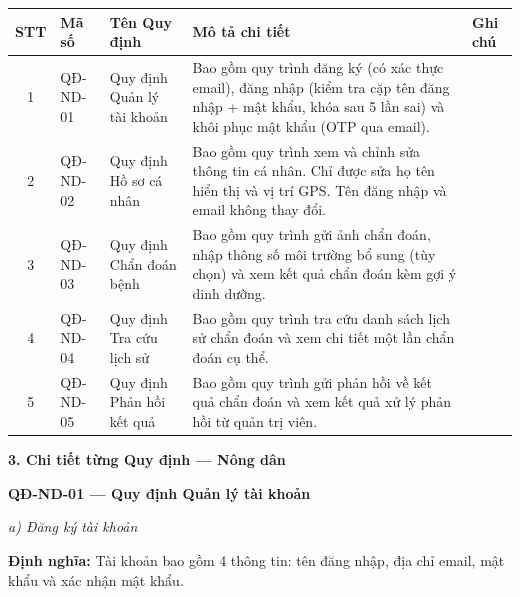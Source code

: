 \documentclass[12pt,a4paper]{article}
\begin{document}
\begin{longtable}{|c|l|l|p{7cm}|l|}
    \hline
    \rowcolor{headerblue}
    \textbf{STT} & \textbf{Mã số} & \textbf{Tên Quy định}      & \textbf{Mô tả chi tiết}                                                                                                                                     & \textbf{Ghi chú} \\
    \hline
    \endhead
    1            & QĐ-ND-01       & Quy định Quản lý tài khoản & Bao gồm quy trình đăng ký (có xác thực email), đăng nhập (kiểm tra cặp tên đăng nhập + mật khẩu, khóa sau 5 lần sai) và khôi phục mật khẩu (OTP qua email). &                  \\
    \hline
    2            & QĐ-ND-02       & Quy định Hồ sơ cá nhân     & Bao gồm quy trình xem và chỉnh sửa thông tin cá nhân. Chỉ được sửa họ tên hiển thị và vị trí GPS. Tên đăng nhập và email không thay đổi.                    &                  \\
    \hline
    3            & QĐ-ND-03       & Quy định Chẩn đoán bệnh    & Bao gồm quy trình gửi ảnh chẩn đoán, nhập thông số môi trường bổ sung (tùy chọn) và xem kết quả chẩn đoán kèm gợi ý dinh dưỡng.                             &                  \\
    \hline
    4            & QĐ-ND-04       & Quy định Tra cứu lịch sử   & Bao gồm quy trình tra cứu danh sách lịch sử chẩn đoán và xem chi tiết một lần chẩn đoán cụ thể.                                                             &                  \\
    \hline
    5            & QĐ-ND-05       & Quy định Phản hồi kết quả  & Bao gồm quy trình gửi phản hồi về kết quả chẩn đoán và xem kết quả xử lý phản hồi từ quản trị viên.                                                         &                  \\
    \hline
\end{longtable}

\vspace{0.3cm}
\textbf{3. Chi tiết từng Quy định --- Nông dân}

\vspace{0.3cm}
\noindent\textbf{QĐ-ND-01 --- Quy định Quản lý tài khoản}

\noindent\textit{a) Đăng ký tài khoản}

\noindent\textbf{Định nghĩa:} Tài khoản bao gồm 4 thông tin: tên đăng nhập, địa chỉ email, mật khẩu và xác nhận mật khẩu.
\end{document}
